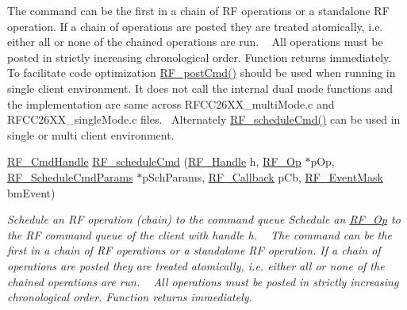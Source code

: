 \begin{DoxyCompactItemize}
\begin{DoxyCompactList}
 The command can be the first in a chain of R\+F operations or a standalone R\+F operation. If a chain of operations are posted they are treated atomically, i.\+e. either all or none of the chained operations are run. ~\newline
 All operations must be posted in strictly increasing chronological order. Function returns immediately. ~\newline
 To facilitate code optimization \hyperlink{_r_f_8h_a2b0ee444fcb74917df94eefea804ecbb}{R\+F\+\_\+post\+Cmd()} should be used when running in single client environment. It does not call the internal dual mode functions and the implementation are same across R\+F\+C\+C26\+X\+X\+\_\+multi\+Mode.\+c and R\+F\+C\+C26\+X\+X\+\_\+single\+Mode.\+c files.~\newline
 Alternately \hyperlink{_r_f_8h_a5e7f25943b5f3942bf4c09cb87f9aa76}{R\+F\+\_\+schedule\+Cmd()} can be used in single or multi client environment. ~\newline
 \end{DoxyCompactList}\item 
\hyperlink{_r_f_8h_acab1f56c62a9fd1ad0a91a46b6da23f1}{R\+F\+\_\+\+Cmd\+Handle} \hyperlink{_r_f_8h_a5e7f25943b5f3942bf4c09cb87f9aa76}{R\+F\+\_\+schedule\+Cmd} (\hyperlink{_r_f_8h_a5e8ab7fc87fb818f435d9b6226ee573f}{R\+F\+\_\+\+Handle} h, \hyperlink{_r_f_8h_a47ea3dea78019340e8f8ceb854de5f02}{R\+F\+\_\+\+Op} $\ast$p\+Op, \hyperlink{struct_r_f___schedule_cmd_params}{R\+F\+\_\+\+Schedule\+Cmd\+Params} $\ast$p\+Sch\+Params, \hyperlink{_r_f_8h_a4d2ce6dc70b0f329dc5e249ec10c574a}{R\+F\+\_\+\+Callback} p\+Cb, \hyperlink{_r_f_8h_a128c46e18dbbaa781abb7abafc35233a}{R\+F\+\_\+\+Event\+Mask} bm\+Event)
\begin{DoxyCompactList}\small\item\em Schedule an R\+F operation (chain) to the command queue Schedule an \hyperlink{_r_f_8h_a47ea3dea78019340e8f8ceb854de5f02}{R\+F\+\_\+\+Op} to the R\+F command queue of the client with handle h. ~\newline
 The command can be the first in a chain of R\+F operations or a standalone R\+F operation. If a chain of operations are posted they are treated atomically, i.\+e. either all or none of the chained operations are run. ~\newline
 All operations must be posted in strictly increasing chronological order. Function returns immediately. ~\newline
 \end{DoxyCompactList}\item 

\end{DoxyCompactItemize}
